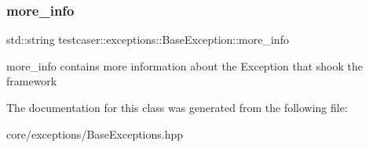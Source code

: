 \subsubsection{\texorpdfstring{more\_info}{more\_info}}
{\footnotesize\ttfamily std\+::string testcaser\+::exceptions\+::\+Base\+Exception\+::more\+\_\+info\hspace{0.3cm}{\ttfamily [protected]}}



more\+\_\+info contains more information about the Exception that shook the framework 



The documentation for this class was generated from the following file\+:\begin{DoxyCompactItemize}
\item 
core/exceptions/Base\+Exceptions.\+hpp\end{DoxyCompactItemize}
